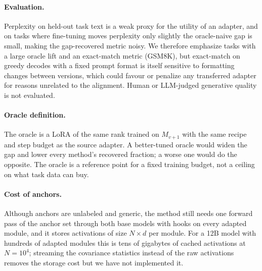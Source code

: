 \paragraph{Evaluation.}
Perplexity on held-out task text is a weak proxy for the utility of an adapter,
and on tasks where fine-tuning moves perplexity only slightly the oracle-naive
gap is small, making the gap-recovered metric noisy. We therefore emphasize
tasks with a large oracle lift and an exact-match metric (GSM8K), but
exact-match on greedy decodes with a fixed prompt format is itself sensitive to
formatting changes between versions, which could favour or penalize any
transferred adapter for reasons unrelated to the alignment. Human or
LLM-judged generative quality is not evaluated.

\paragraph{Oracle definition.}
The oracle is a LoRA of the same rank trained on $M_{v+1}$ with the same
recipe and step budget as the source adapter. A better-tuned oracle would
widen the gap and lower every method's recovered fraction; a worse one would
do the opposite. The oracle is a reference point for a fixed training budget,
not a ceiling on what task data can buy.

\paragraph{Cost of anchors.}
Although anchors are unlabeled and generic, the method still needs one forward
pass of the anchor set through both base models with hooks on every adapted
module, and it stores activations of size $N\times d$ per module. For a 12B
model with hundreds of adapted modules this is tens of gigabytes of cached
activations at $N=10^4$; streaming the covariance statistics instead of the
raw activations removes the storage cost but we have not implemented it.
